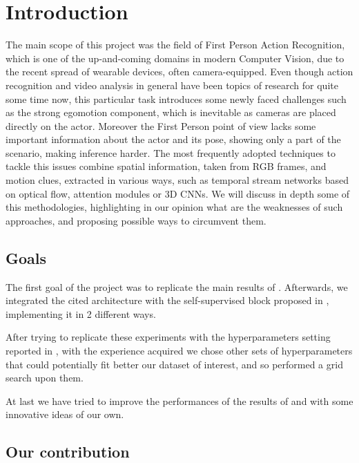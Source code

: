 \documentclass[10pt,twocolumn,hidelinks,letterpaper]{article}
\begin{document}
\section{Introduction}
The main scope of this project was the field of First Person Action Recognition, which is one of the up-and-coming domains in modern Computer Vision, due to the recent spread of wearable devices, often camera-equipped.
Even though action recognition and video analysis in general have been topics of research for quite some time now, this particular task introduces some newly faced challenges such as the strong egomotion component, which is inevitable as cameras are placed directly on the actor. Moreover the First Person point of view lacks some important information about the actor and its pose, showing only a part of the scenario, making inference harder. The most frequently adopted techniques to tackle this issues combine spatial information, taken from RGB frames, and motion clues, extracted in various ways, such as temporal stream networks based on optical flow, attention modules or 3D CNNs. We will discuss in depth some of this methodologies, highlighting in our opinion what are the weaknesses of such approaches, and proposing possible ways to circumvent them.

\subsection{Goals}
The first goal of the project was to replicate the main results of \cite{egornn}. Afterwards, we integrated the cited architecture with the self-supervised block proposed in \cite{sparnet}, implementing it in 2 different ways.

After trying to replicate these experiments with the hyperparameters setting reported in \cite{egornn}, with the experience acquired we chose other sets of hyperparameters that could potentially fit better our dataset of interest, and so performed a grid search upon them.

At last we have tried to improve the performances of the results of \cite{egornn} and \cite{sparnet} with some innovative ideas of our own.


\subsection{Our contribution}
\end{document}
